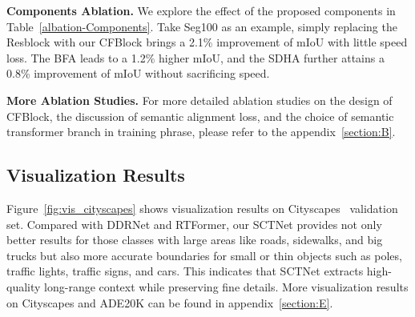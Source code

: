\documentclass[letterpaper]{article} %
\begin{document}
\noindent
{\bf Components Ablation.}
We explore the effect of the proposed components in Table~\ref{albation-Components}. Take Seg100 as an example, simply replacing the Resblock with our CFBlock brings a 2.1\% improvement of mIoU with little speed loss. The BFA leads to a 1.2\% higher mIoU, and the SDHA further attains a 0.8\% improvement of mIoU without sacrificing speed.

\begin{table}
  \centering
  
  \caption{\textbf{Ablation studies on the components of SCTNet}} 
  \label{albation-Components}
\vspace{-10pt}
\end{table}

\noindent
{\bf More Ablation Studies.} For more detailed ablation studies on the design of CFBlock, the discussion of semantic alignment loss, and the choice of semantic transformer branch in training phrase, please refer to the appendix~\ref{section:B}.


\subsection{Visualization Results}
Figure~\ref{fig:vis_cityscapes} shows visualization results on Cityscapes~\cite{cordts2016cityscapes} validation set. Compared with DDRNet and RTFormer, our SCTNet provides not only better results for those classes with large areas like roads, sidewalks, and big trucks but also more accurate boundaries for small or thin objects such as poles, traffic lights, traffic signs, and cars. This indicates that SCTNet extracts high-quality long-range context while preserving fine details. More visualization results on Cityscapes and ADE20K can be found in appendix~\ref{section:E}.
\end{document}
